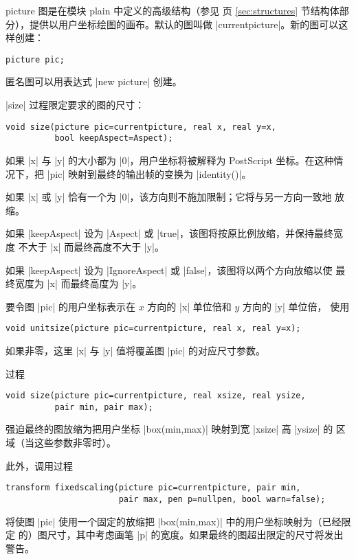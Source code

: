 \documentclass{ctexbook}
\makeatletter
\newenvironment{typelist}{\itemize
  \let\old@item\@item
  \def\@item[##1]{\expandafter\old@item[\ttfamily\color{type!50!black}##1]}}
{\enditemize}
\newcommand*\prgname[1]{\textsf{#1}}
\makeatother
\begin{document}
\begin{typelist}
\item[picture]
图是在模块 \prgname{plain} 中定义的高级结构（参见 \pageref{sec:structures} 页
\ref{sec:structures} 节结构体部分），提供以用户坐标绘图的画布。默认的图叫做
|currentpicture|。新的图可以这样创建：
\begin{lstlisting}
picture pic;
\end{lstlisting}
匿名图可以用表达式 |new picture| 创建。

|size| 过程限定要求的图的尺寸：
\begin{lstlisting}
void size(picture pic=currentpicture, real x, real y=x,
          bool keepAspect=Aspect);
\end{lstlisting}
如果 |x| 与 |y| 的大小都为 |0|，用户坐标将被解释为 \prgname{PostScript}
坐标。在这种情况下，把 |pic| 映射到最终的输出帧的变换为 |identity()|。

如果 |x| 或 |y| 恰有一个为 |0|，该方向则不施加限制；它将与另一方向一致地
放缩。

如果 |keepAspect| 设为 |Aspect| 或 |true|，该图将按原比例放缩，并保持最终宽度
不大于 |x| 而最终高度不大于 |y|。

如果 |keepAspect| 设为 |IgnoreAspect| 或 |false|，该图将以两个方向放缩以使
最终宽度为 |x| 而最终高度为 |y|。

要令图 |pic| 的用户坐标表示在 $x$ 方向的 |x| 单位倍和 $y$ 方向的 |y| 单位倍，
使用
\begin{lstlisting}
void unitsize(picture pic=currentpicture, real x, real y=x);
\end{lstlisting}
如果非零，这里 |x| 与 |y| 值将覆盖图 |pic| 的对应尺寸参数。

过程
\begin{lstlisting}
void size(picture pic=currentpicture, real xsize, real ysize,
          pair min, pair max);
\end{lstlisting}
强迫最终的图放缩为把用户坐标 |box(min,max)| 映射到宽 |xsize| 高 |ysize| 的
区域（当这些参数非零时）。

此外，调用过程
\begin{lstlisting}
transform fixedscaling(picture pic=currentpicture, pair min,
                       pair max, pen p=nullpen, bool warn=false);
\end{lstlisting}
将使图 |pic| 使用一个固定的放缩把 |box(min,max)| 中的用户坐标映射为（已经限定
的）图尺寸，其中考虑画笔 |p| 的宽度。如果最终的图超出限定的尺寸将发出警告。


\end{typelist}
\end{document}
